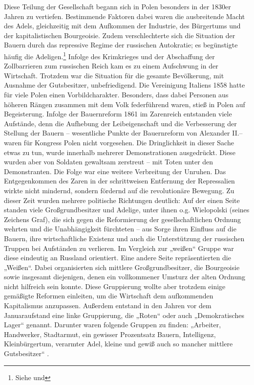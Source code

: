 \documentclass[12pt,headsepline,a4paper]{scrartcl}
\begin{document}
Diese Teilung der Gesellschaft begann sich in Polen besonders in der 1830er Jahren zu vertiefen.
Bestimmende Faktoren dabei waren die ausbreitende Macht des Adels, gleichzeitig mit dem
Aufkommen der Industrie, des Bürgertums und der kapitalistischen Bourgeoisie. Zudem
verschlechterte sich die Situation der Bauern durch das repressive Regime der russischen Autokratie; 
es begünstigte häufig die Adeligen.\footnote{
Siehe  und 
} Infolge des Krimkrieges und der Abschaffung der
Zollbarrieren zum russischen Reich kam es zu einem Aufschwung in der Wirtschaft.\autocite[79--81]{gentzen1958} Trotzdem war
die Situation für die gesamte Bevölkerung, mit Ausnahme der Gutsbesitzer, unbefriedigend. Die
Vereinigung Italiens 1858 hatte für viele Polen einen Vorbildcharakter.\autocite[52]{gentzen1958} 
Besonders, dass dabei
Personen aus höheren Rängen zusammen mit dem Volk federführend waren, stieß in Polen auf
Begeisterung. Infolge der Bauernreform 1861 im Zarenreich entstanden viele Aufstände, denn
die Aufhebung der Leibeigenschaft und die Verbesserung der Stellung der Bauern – wesentliche
Punkte der Bauernreform von Alexander II.– waren für Kongress Polen nicht vorgesehen. Die
Dringlichkeit in dieser Sache etwas zu tun, wurde innerhalb mehrerer Demonstrationen
ausgedrückt. Diese wurden aber von Soldaten gewaltsam zerstreut – mit Toten unter den
Demonstranten. Die Folge war eine weitere Verbreitung der Unruhen. Das Entgegenkommen des
Zaren in der schrittweisen Entfernung der Repressalien wirkte nicht mindernd, sondern fördernd auf
die revolutionäre Bewegung. Zu dieser Zeit wurden mehrere politische Richtungen deutlich: Auf
der einen Seite standen viele Großgrundbesitzer und Adelige, unter ihnen o.g. Wielopolski (seines
Zeichens Graf), die sich gegen die Reformierung der gesellschaftlichen Ordnung wehrten und die
Unabhängigkeit fürchteten – aus Sorge ihren Einfluss auf die Bauern, ihre wirtschaftliche Existenz
und auch die Unterstützung der russischen Truppen bei Aufständen zu verlieren. Im Vergleich zur
„weißen“ Gruppe war diese eindeutig an Russland orientiert. Eine andere Seite repräsentierten
die „Weißen“. Dabei organisierten sich mittlere Großgrundbesitzer, die Bourgeoisie sowie
insgesamt diejenigen, denen ein vollkommener Umsturz der alten Ordnung nicht hilfreich sein
konnte. Diese Gruppierung wollte aber trotzdem einige gemäßigte Reformen einleiten, um die
Wirtschaft dem aufkommenden Kapitalismus anzupassen. Außerdem entstand in den Jahren vor
dem Januaraufstand eine linke Gruppierung, die „Roten“ oder auch „Demokratisches Lager“
genannt. Darunter waren folgende Gruppen zu finden: „Arbeiter, Handwerker, Stadtarmut, ein
gewisser Prozentsatz Bauern, Intelligenz, Kleinbürgertum, verarmter Adel, kleine und gewiß auch
so mancher mittlere Gutsbesitzer“\autocite[18]{kowalski1954} .
\end{document}

